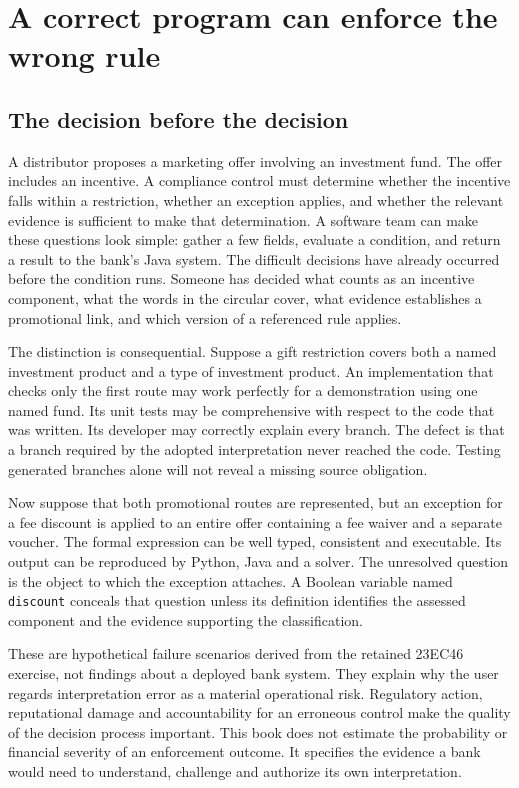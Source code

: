 \chapter{A correct program can enforce the wrong rule}
\label{ch:problem}

\section{The decision before the decision}
\label{sec:problem-decision}
A distributor proposes a marketing offer involving an investment fund. The
offer includes an incentive. A compliance control must determine whether the
incentive falls within a restriction, whether an exception applies, and whether
the relevant evidence is sufficient to make that determination. A software team
can make these questions look simple: gather a few fields, evaluate a condition,
and return a result to the bank's Java system. The difficult decisions have
already occurred before the condition runs. Someone has decided what counts as
an incentive component, what the words in the circular cover, what evidence
establishes a promotional link, and which version of a referenced rule applies.

The distinction is consequential. Suppose a gift restriction covers both a
named investment product and a type of investment product. An implementation
that checks only the first route may work perfectly for a demonstration using
one named fund. Its unit tests may be comprehensive with respect to the code
that was written. Its developer may correctly explain every branch. The defect
is that a branch required by the adopted interpretation never reached the code.
Testing generated branches alone will not reveal a missing source obligation.

Now suppose that both promotional routes are represented, but an exception for
a fee discount is applied to an entire offer containing a fee waiver and a
separate voucher. The formal expression can be well typed, consistent and
executable. Its output can be reproduced by Python, Java and a solver. The
unresolved question is the object to which the exception attaches. A Boolean
variable named \texttt{discount} conceals that question unless its definition
identifies the assessed component and the evidence supporting the classification.

These are hypothetical failure scenarios derived from the retained 23EC46
exercise, not findings about a deployed bank system. They explain why the user
regards interpretation error as a material operational risk. Regulatory action,
reputational damage and accountability for an erroneous control make the quality
of the decision process important. This book does not estimate the probability
or financial severity of an enforcement outcome. It specifies the evidence a
bank would need to understand, challenge and authorize its own interpretation.

